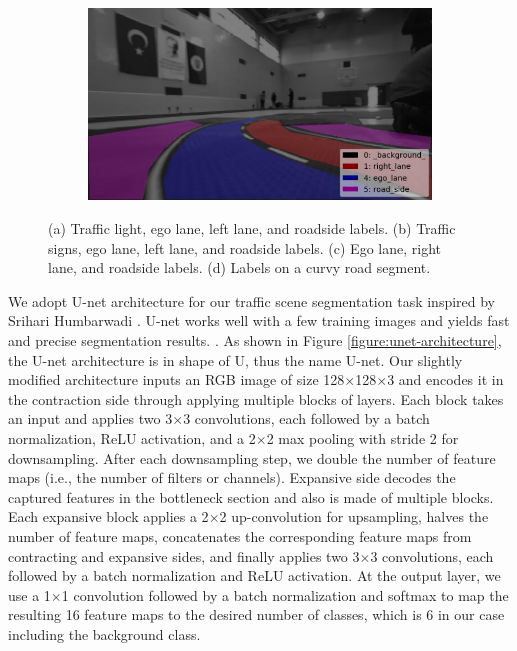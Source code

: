 \begin{figure}[h]
\begin{subfigure}[b]{0.4\linewidth}
    \caption{}
  \end{subfigure}
  \begin{subfigure}[b]{0.4\linewidth}
    \includegraphics[width=\linewidth]{figures/label-visualization4.jpg}
    \caption{}
  \end{subfigure}
  \caption[Visualization of semantic segmentation labels]{(a) Traffic light,
    ego lane, left lane, and roadside labels. (b) Traffic signs, ego lane, left
    lane, and roadside labels. (c) Ego lane, right lane, and roadside labels.
    (d) Labels on a curvy road segment.}
  \label{figure:label-visualization}
\end{figure}

We adopt U-net architecture for our traffic scene segmentation task inspired
by Srihari Humbarwadi \cite{Srihari2018SS}. U-net works well with a few
training images and yields fast and precise segmentation results.
\cite{Ronneberger2015UNetCN}. As shown in Figure
\ref{figure:unet-architecture}, the U-net architecture is in shape of U, thus
the name U-net. Our slightly modified architecture inputs an RGB image of size
128$\times$128$\times$3 and encodes it in the contraction side through applying
multiple blocks of layers. Each block takes an input and applies two 3$\times$3
convolutions, each followed by a batch normalization, ReLU activation, and a
2$\times$2 max pooling with stride 2 for downsampling. After each downsampling
step, we double the number of feature maps (i.e., the number of filters or
channels). Expansive side decodes the captured features in the bottleneck
section and also is made of multiple blocks. Each expansive block applies a
2$\times$2 up-convolution for upsampling, halves the number of feature maps,
concatenates the corresponding feature maps from contracting and expansive
sides, and finally applies two 3$\times$3 convolutions, each followed by a
batch normalization and ReLU activation. At the output layer, we use a
1$\times$1 convolution followed by a batch normalization and softmax to map the
resulting 16 feature maps to the desired number of classes, which is 6 in our
case including the background class.

